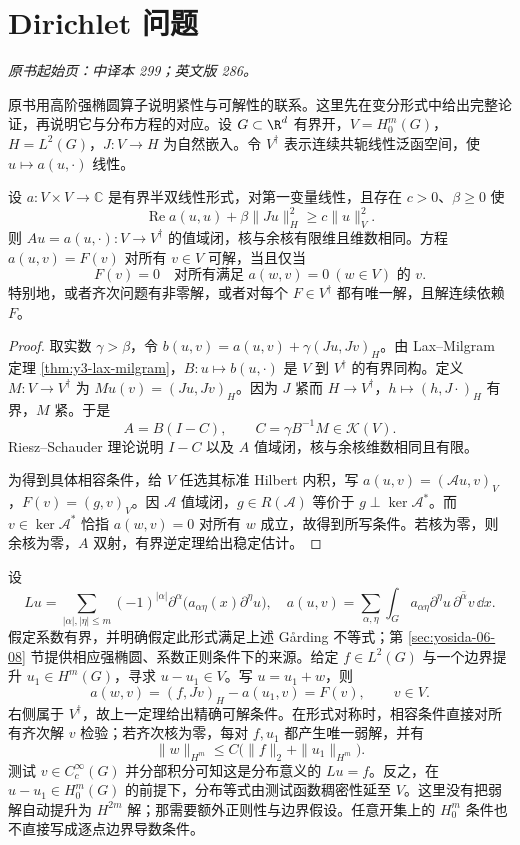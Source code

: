 \section{Dirichlet 问题}\label{sec:yosida-10-06}
\noindent\textit{原书起始页：中译本 299；英文版 286。}

原书用高阶强椭圆算子说明紧性与可解性的联系。这里先在变分形式中给出完整论证，再说明它与分布方程的对应。设 $G\subset\R^d$ 有界开，$V=H_0^m(G)$，$H=L^2(G)$，$J:V\to H$ 为自然嵌入。令 $V^\dagger$ 表示连续共轭线性泛函空间，使 $u\mapsto a(u,\cdot)$ 线性。

\begin{theorem}\label{thm:y10-dirichlet}
设 $a:V\times V\to\mathbb C$ 是有界半双线性形式，对第一变量线性，且存在 $c>0$、$\beta\ge0$ 使
\[
 \operatorname{Re}a(u,u)+\beta\|Ju\|_H^2\ge c\|u\|_V^2.
\]
则 $Au=a(u,\cdot):V\to V^\dagger$ 的值域闭，核与余核有限维且维数相同。方程 $a(u,v)=F(v)$ 对所有 $v\in V$ 可解，当且仅当
\[
 F(v)=0\quad\text{对所有满足 }a(w,v)=0\ (w\in V)\text{ 的 }v.
\]
特别地，或者齐次问题有非零解，或者对每个 $F\in V^\dagger$ 都有唯一解，且解连续依赖 $F$。
\end{theorem}
\begin{proof}
取实数 $\gamma>\beta$，令 $b(u,v)=a(u,v)+\gamma(Ju,Jv)_H$。由 Lax--Milgram 定理 \ref{thm:y3-lax-milgram}，$B:u\mapsto b(u,\cdot)$ 是 $V$ 到 $V^\dagger$ 的有界同构。定义 $M:V\to V^\dagger$ 为 $Mu(v)=(Ju,Jv)_H$。因为 $J$ 紧而 $H\to V^\dagger$，$h\mapsto(h,J\cdot)_H$ 有界，$M$ 紧。于是
\[
 A=B(I-C),\qquad C=\gamma B^{-1}M\in\mathcal K(V).
\]
Riesz--Schauder 理论说明 $I-C$ 以及 $A$ 值域闭，核与余核维数相同且有限。

为得到具体相容条件，给 $V$ 任选其标准 Hilbert 内积，写 $a(u,v)=(\mathcal Au,v)_V$，$F(v)=(g,v)_V$。因 $\mathcal A$ 值域闭，$g\in R(\mathcal A)$ 等价于 $g\perp\ker\mathcal A^*$。而 $v\in\ker\mathcal A^*$ 恰指 $a(w,v)=0$ 对所有 $w$ 成立，故得到所写条件。若核为零，则余核为零，$A$ 双射，有界逆定理给出稳定估计。
\end{proof}

\begin{example}[高阶算子与非齐次边界数据]
设
\[
 Lu=\sum_{|\alpha|,|\eta|\le m}(-1)^{|\alpha|}
 \partial^\alpha\bigl(a_{\alpha\eta}(x)\partial^\eta u\bigr),\quad
 a(u,v)=\sum_{\alpha,\eta}\int_G a_{\alpha\eta}
 \partial^\eta u\,\overline{\partial^\alpha v}\,\dd x.
\]
假定系数有界，并明确假定此形式满足上述 Gårding 不等式；第 \ref{sec:yosida-06-08} 节提供相应强椭圆、系数正则条件下的来源。给定 $f\in L^2(G)$ 与一个边界提升 $u_1\in H^m(G)$，寻求 $u-u_1\in V$。写 $u=u_1+w$，则
\[
 a(w,v)=(f,Jv)_H-a(u_1,v)=F(v),\qquad v\in V.
\]
右侧属于 $V^\dagger$，故上一定理给出精确可解条件。在形式对称时，相容条件直接对所有齐次解 $v$ 检验；若齐次核为零，每对 $f,u_1$ 都产生唯一弱解，并有
\[
 \|w\|_{H^m}\le C\bigl(\|f\|_2+\|u_1\|_{H^m}\bigr).
\]
测试 $v\in C_c^\infty(G)$ 并分部积分可知这是分布意义的 $Lu=f$。反之，在 $u-u_1\in H_0^m(G)$ 的前提下，分布等式由测试函数稠密性延至 $V$。这里没有把弱解自动提升为 $H^{2m}$ 解；那需要额外正则性与边界假设。任意开集上的 $H_0^m$ 条件也不直接写成逐点边界导数条件。
\end{example}

